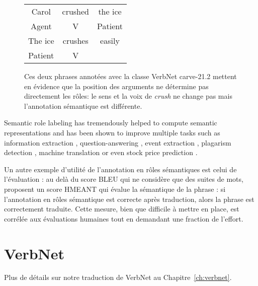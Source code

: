 \begin{figure}[ht]
    \centering
    \begin{tabular}{ccc}
        \toprule
        Carol & crushed   & the ice \\
        Agent & V         & Patient \\
        \midrule
        The ice & crushes & easily  \\
        Patient & V       &         \\
        \bottomrule
    \end{tabular}
    \caption{\label{fig:example_srl}Ces deux phrases annotées avec la classe VerbNet carve-21.2 mettent en évidence que la position des arguments ne détermine pas directement les rôles: le sens et la voix de \textit{crush} ne change pas mais l'annotation sémantique est différente.}
\end{figure}

Semantic role labeling has tremendously helped to compute semantic
representations and has been shown to improve multiple tasks such as
information extraction \citep{surdeanu2003using}, question-answering
\citep{shen2007using}, event extraction \citep{exner2011using}, plagarism
detection \citep{osman2012improved}, machine translation
\citep{bazrafshan2013semantic} or even stock price prediction
\citep{xie2013semantic}.

Un autre exemple d'utilité de l'annotation en rôles sémantiques est celui de
l'évaluation : au delà du score BLEU qui ne considère que des suites de mots,
\cite{lo2011smt} proposent un score HMEANT qui évalue la sémantique de la
phrase : si l'annotation en rôles sémantique est correcte après traduction,
alors la phrase est correctement traduite. Cette mesure, bien que difficile à
mettre en place, est corrélée aux évaluations humaines tout en demandant une
fraction de l'effort.

\section{VerbNet}
\label{presentation_verbnet}

Plus de détails sur notre traduction de VerbNet au Chapitre~\ref{ch:verbnet}.
